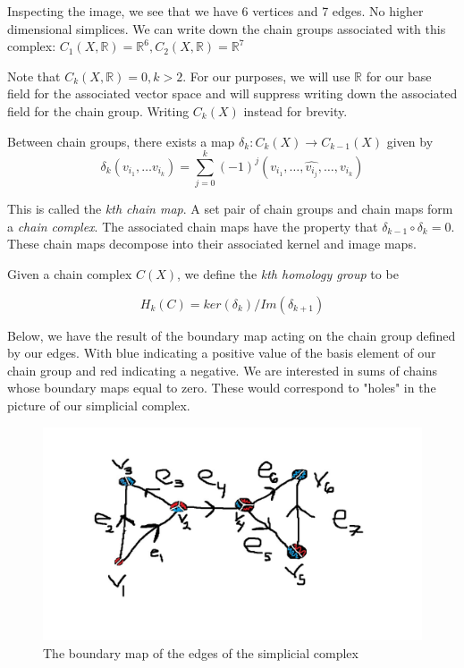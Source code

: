 \documentclass[12pt]{article}
\begin{document}
Inspecting the image, we see that we have 6 vertices and 7 edges. No higher dimensional simplices. 
We can write down the chain groups associated with this complex: $C_1(X, \mathbb{R}) = \mathbb{R}^6 , C_2(X, \mathbb{R}) = \mathbb{R}^7$


Note that $C_k(X, \mathbb{R}) = 0, k > 2$. For our purposes, we will use $\mathbb{R}$ for our base field for the 
associated vector space and will suppress writing down the associated field for the chain group. Writing 
$C_k(X)$ instead for brevity.

Between chain groups, there exists a map $\delta_{k}: C_k(X) \to C_{k-1}(X)$ given by
\begin{equation}
  \delta_k (v_{i_1}, \ldots v_{i_k}) =  \sum_{j = 0}^{k} (-1)^j (v_{i_1}, \ldots, \hat{v_{i_j}} , \ldots, v_{i_k})
\end{equation}

This is called the \textit{kth chain map}. A set pair of chain groups and chain maps form a \textit{chain complex}.
The associated chain maps have the property that $\delta_{k-1} \circ \delta_{k} = 0$. These chain maps decompose 
into their associated kernel and image maps.

Given a chain complex $C(X)$, we define the \textit{kth homology group} to be 

\begin{equation}
H_k(C) = ker(\delta_k) / Im(\delta_{k+1})
\end{equation}

Below, we have the result of the boundary map acting on the chain group defined by 
our edges. With blue indicating a positive value of the basis element of our chain 
group and red indicating a negative. We are interested in sums of chains whose boundary
maps equal to zero. These would correspond to "holes" in the picture of our simplicial complex.


\begin{figure}[ht]
  \begin{center}
      \includegraphics[scale = .4]{Colored_Cx.jpg}
  \end{center}
\caption{The boundary map of the edges of the simplicial complex}
\end{figure}
\end{document}
